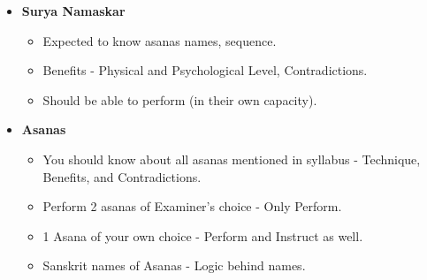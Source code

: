 \begin{frame}[fragile]
\begin{itemize}
\begin{itemize}
        \end{itemize}
        \item \textbf{Surya Namaskar}
        \begin{itemize}
            \item Expected to know asanas names, sequence.
            \item Benefits - Physical and Psychological Level, Contradictions.
            \item Should be able to perform (in their own capacity).
        \end{itemize}
        \item \textbf{Asanas}
        \begin{itemize}
            \item You should know about all asanas mentioned in syllabus - Technique, Benefits, and Contradictions.
            \item Perform 2 asanas of Examiner's choice - Only Perform.
            \item 1 Asana of your own choice - Perform and Instruct as well.
            \item Sanskrit names of Asanas - Logic behind names.
        \end{itemize}

    \end{itemize}
\end{frame}

